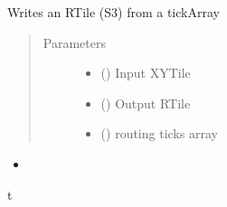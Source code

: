 \documentclass[letterpaper,10pt,english]{sphinxmanual}
\begin{document}
\begin{fulllineitems}
\label{\detokenize{reference:taipanPyRouter.writeOuputFile}}
Writes an RTile (S3) from a tickArray
\begin{quote}\begin{description}
\item[{Parameters}] \leavevmode\begin{itemize}
\item {} 
 () \textendash{} Input XYTile

\item {} 
 () \textendash{} Output RTile

\item {} 
 () \textendash{} routing ticks array

\end{itemize}

\end{description}\end{quote}

\end{fulllineitems}

\begin{itemize}
\item {} 

\end{itemize}


\renewcommand{\indexname}{Python Module Index}
\begin{sphinxtheindex}
\def\bigletter#1{{\Large\sffamily#1}\nopagebreak\vspace{1mm}}
\bigletter{t}
\item {}
\end{sphinxtheindex}

\renewcommand{\indexname}{Index}
\printindex
\end{document}
